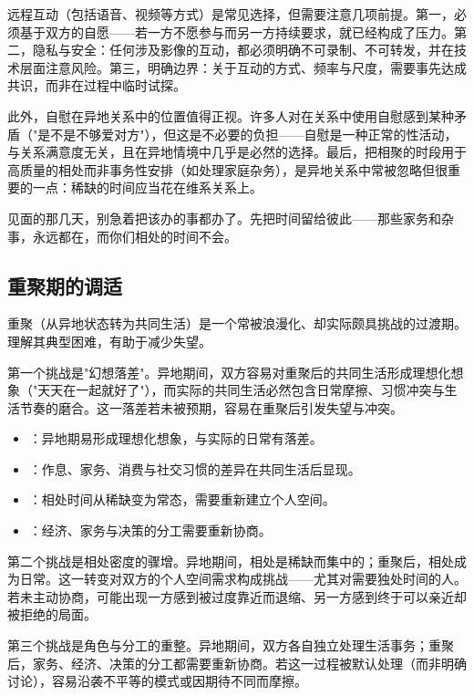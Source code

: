远程互动（包括语音、视频等方式）是常见选择，但需要注意几项前提。第一，必须基于双方的自愿——若一方不愿参与而另一方持续要求，就已经构成了压力。第二，隐私与安全：任何涉及影像的互动，都必须明确不可录制、不可转发，并在技术层面注意风险。第三，明确边界：关于互动的方式、频率与尺度，需要事先达成共识，而非在过程中临时试探。

此外，自慰在异地关系中的位置值得正视。许多人对在关系中使用自慰感到某种矛盾（"是不是不够爱对方"），但这是不必要的负担——自慰是一种正常的性活动，与关系满意度无关，且在异地情境中几乎是必然的选择。最后，把相聚的时段用于高质量的相处而非事务性安排（如处理家庭杂务），是异地关系中常被忽略但很重要的一点：稀缺的时间应当花在维系关系上。

\begin{tcolorbox}[colback=pink!5!white,colframe=red!50!black,title=贴心小叮咛]
见面的那几天，别急着把该办的事都办了。先把时间留给彼此——那些家务和杂事，永远都在，而你们相处的时间不会。
\end{tcolorbox}
\subsection{重聚期的调适}

重聚（从异地状态转为共同生活）是一个常被浪漫化、却实际颇具挑战的过渡期。理解其典型困难，有助于减少失望。

第一个挑战是"幻想落差"。异地期间，双方容易对重聚后的共同生活形成理想化想象（"天天在一起就好了"），而实际的共同生活必然包含日常摩擦、习惯冲突与生活节奏的磨合。这一落差若未被预期，容易在重聚后引发失望与冲突。

\begin{itemize}
  \item {}：异地期易形成理想化想象，与实际的日常有落差。
  \item {}：作息、家务、消费与社交习惯的差异在共同生活后显现。
  \item {}：相处时间从稀缺变为常态，需要重新建立个人空间。
  \item {}：经济、家务与决策的分工需要重新协商。
\end{itemize}

第二个挑战是相处密度的骤增。异地期间，相处是稀缺而集中的；重聚后，相处成为日常。这一转变对双方的个人空间需求构成挑战——尤其对需要独处时间的人。若未主动协商，可能出现一方感到被过度靠近而退缩、另一方感到终于可以亲近却被拒绝的局面。

第三个挑战是角色与分工的重整。异地期间，双方各自独立处理生活事务；重聚后，家务、经济、决策的分工都需要重新协商。若这一过程被默认处理（而非明确讨论），容易沿袭不平等的模式或因期待不同而摩擦。

